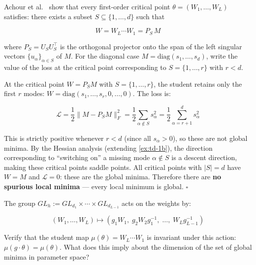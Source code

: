 \documentclass[11pt]{article}
\begin{document}
\begin{exercise}
\label{ex:td-1c}
Achour et al.~\cite{achour2024} show that every
first-order critical point \(\theta = (W_1, \ldots, W_L)\) satisfies:
there exists a subset \(S \subseteq \{1, \ldots, d\}\) such that

\[W = W_L \cdots W_1 = P_S\, M\]

where \(P_S = U_S U_S^\top\) is the orthogonal projector onto the span
of the left singular vectors \(\{u_\alpha\}_{\alpha \in S}\) of \(M\).
For the diagonal case \(M = \text{diag}(s_1, \ldots, s_d)\), write the
value of the loss at the critical point corresponding to
\(S = \{1, \ldots, r\}\) with \(r < d\).
\end{exercise}

\begin{solution}[ex:td-1c]
At the critical point \(W = P_S M\) with
\(S = \{1, \ldots, r\}\), the student retains only the first \(r\)
modes: \(W = \text{diag}(s_1, \ldots, s_r, 0, \ldots, 0)\). The loss is:

\[\mathcal{L} = \frac{1}{2}\|M - P_S M\|_F^2 = \frac{1}{2}\sum_{\alpha \notin S} s_\alpha^2 = \frac{1}{2}\sum_{\alpha=r+1}^d s_\alpha^2\]

This is strictly positive whenever \(r < d\) (since all
\(s_\alpha > 0\)), so these are not global minima. By the Hessian
analysis (extending \cref{ex:td-1b}), the direction corresponding to
``switching on'' a missing mode \(\alpha \notin S\) is a descent
direction, making these critical points saddle points. All critical
points with \(|S| = d\) have \(W = M\) and \(\mathcal{L} = 0\): these
are the global minima. Therefore there are \textbf{no spurious local
minima} --- every local minimum is global. \(\square\)
\end{solution}

\begin{exercise}
\label{ex:td-1d}
The group
\(GL_h := GL_{d_1} \times \cdots \times GL_{d_{L-1}}\) acts on the
weights by:

\[(W_1, \ldots, W_L) \mapsto (g_1 W_1,\; g_2 W_2 g_1^{-1},\; \ldots,\; W_L g_{L-1}^{-1})\]

Verify that the student map \(\mu(\theta) = W_L \cdots W_1\) is
invariant under this action: \(\mu(g \cdot \theta) = \mu(\theta)\). What
does this imply about the dimension of the set of global minima in
parameter space?
\end{exercise}
\end{document}
